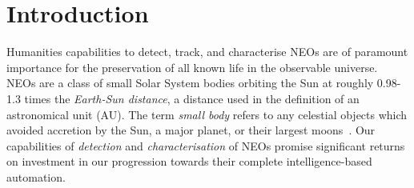 \chapter{Introduction}

Humanities capabilities to detect, track, and characterise \glspl{NEO} are of 
paramount importance for the preservation of all known life in the observable universe. \glspl{NEO} are a class of small Solar System bodies orbiting the Sun at roughly 0.98-1.3 times the \textit{Earth-Sun distance}, a distance used in the definition of an astronomical unit (AU). The term \textit{small body} refers to any celestial objects which avoided accretion by the Sun, a major planet, or their largest moons~\cite[p.~1]{Davidsson2021}. Our capabilities of \textit{detection} and \textit{characterisation} of \glspl{NEO} promise significant returns on investment in our progression towards their complete intelligence-based automation. %

